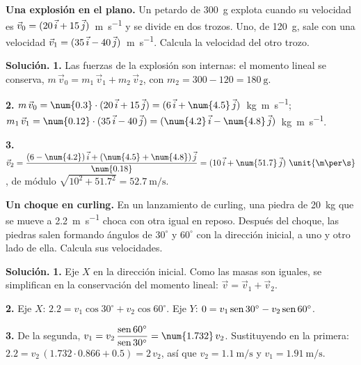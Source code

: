 \begin{example}
    \textbf{Una explosión en el plano.} Un petardo de \qty{300}{\g} explota cuando su velocidad es
    \(\vec{v}_0 = (20\,\vec{i} + 15\,\vec{j})\)~\unit{\m\per\s} y se divide en dos trozos. Uno, de \qty{120}{\g}, sale con una velocidad
    \(\vec{v}_1 = (35\,\vec{i} - 40\,\vec{j})\)~\unit{\m\per\s}. Calcula la velocidad del otro trozo.

    \textbf{Solución.} \textbf{1.} Las fuerzas de la explosión son internas: el momento lineal se conserva,
    \(m\,\vec{v}_0 = m_1\,\vec{v}_1 + m_2\,\vec{v}_2\), con \(m_2 = 300 - 120 = \qty{180}{\g}\).

    \textbf{2.} \(m\,\vec{v}_0 = \num{0.3} \cdot (20\,\ivec + 15\,\jvec) = (6\,\ivec + \num{4.5}\,\jvec)\)~\unit{\kg\m\per\s};
    \(m_1\,\vec{v}_1 = \num{0.12} \cdot (35\,\ivec - 40\,\jvec) = (\num{4.2}\,\ivec - \num{4.8}\,\jvec)\)~\unit{\kg\m\per\s}.

    \textbf{3.} \(\vec{v}_2 = \dfrac{(6 - \num{4.2})\,\ivec + (\num{4.5} + \num{4.8})\,\jvec}{\num{0.18}} = (10\,\ivec + \num{51.7}\,\jvec)~\unit{\m\per\s}\),
    de módulo \(\sqrt{10^2 + \num{51.7}^2} = \qty{52.7}{\m\per\s}\).
\end{example}

\begin{example}
    \textbf{Un choque en curling.} En un lanzamiento de curling, una piedra de \qty{20}{\kg} que se mueve a \qty{2.2}{\m\per\s}
    choca con otra igual en reposo. Después del choque, las piedras salen formando ángulos de \(30^\circ\) y \(60^\circ\) con la
    dirección inicial, a uno y otro lado de ella. Calcula sus velocidades.

    \textbf{Solución.} \textbf{1.} Eje \(X\) en la dirección inicial. Como las masas son iguales, se simplifican en la conservación del
    momento lineal: \(\vec{v} = \vec{v}_1 + \vec{v}_2\).

    \textbf{2.} Eje \(X\): \(\num{2.2} = v_1\cos 30^\circ + v_2\cos 60^\circ\). Eje \(Y\): \(0 = v_1\operatorname{sen} 30^\circ - v_2\operatorname{sen} 60^\circ\).

    \textbf{3.} De la segunda, \(v_1 = v_2\,\dfrac{\sen 60^\circ}{\sen 30^\circ} = \num{1.732}\,v_2\). Sustituyendo en la primera:
    \(\num{2.2} = v_2\,(\num{1.732} \cdot \num{0.866} + \num{0.5}) = 2\,v_2\), así que \(v_2 = \qty{1.1}{\m\per\s}\) y
    \(v_1 = \qty{1.91}{\m\per\s}\).
\end{example}

